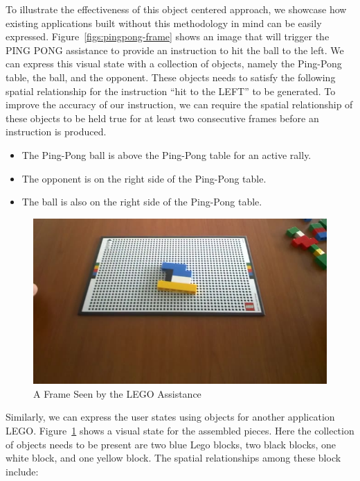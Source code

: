 To illustrate the effectiveness of this object centered approach, we showcase
how existing applications built without this methodology in mind can be easily
expressed. Figure~\ref{figs:pingpong-frame} shows an image that will trigger the
PING PONG assistance to provide an instruction to hit the ball to the left. We
can express this visual state with a collection of objects, namely the Ping-Pong
table, the ball, and the opponent. These objects needs to satisfy the following
spatial relationship for the instruction ``hit to the LEFT'' to be generated. To
improve the accuracy of our instruction, we can require the spatial relationship
of these objects to be held true for at least two consecutive frames before an
instruction is produced.

\begin{itemize}
  \item The Ping-Pong ball is above the Ping-Pong table for an active rally.
  \item The opponent is on the right side of the Ping-Pong table.
  \item The ball is also on the right side of the Ping-Pong table.
\end{itemize}

\begin{figure}
  \centering
  \includegraphics[trim={0 0 0 0},width=.9\linewidth]{FIGS/lego}
	\caption{A Frame Seen by the LEGO Assistance}
    \label{fig:lego-image}
\end{figure}

Similarly, we can express the user states using objects for another
application LEGO. Figure~\ref{fig:lego-image} shows a visual state for the
assembled pieces. Here the collection of objects needs to be present are two
blue Lego blocks, two black blocks, one white block, and one yellow block. The
spatial relationships among these block include:

